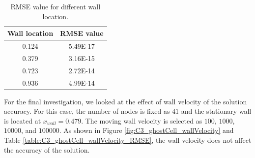 \begin{table}[H]
\centering
\begin{tabular}{c | c}
	 Wall location & RMSE value \\ \hline \hline
	 0.124 & 5.49E-17 \\ \hline
	 0.379 & 3.16E-15 \\ \hline
	 0.723 & 2.72E-14 \\ \hline
	 0.936 & 4.99E-14
\end{tabular}
\caption{RMSE value for different wall location.}
\label{table:C3_ghostCell_wallLocation_RMSE}
\end{table}

For the final investigation, we looked at the effect of wall velocity of the solution accuracy. For this case, the number of nodes is fixed as $41$ and the stationary wall is located at $x_{wall} = 0.479$. The moving wall velocity is selected as $100$, $1000$, $10000$, and $100000$. As shown in Figure \ref{fig:C3_ghostCell_wallVelocity} and Table \ref{table:C3_ghostCell_wallVelocity_RMSE}, the wall velocity does not affect the accuracy of the solution.

